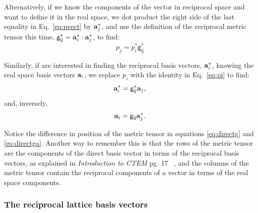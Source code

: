 Alternatively, if we know the components of the vector in reciprocal space and want to define it in the real space, we dot product the right side of the last equality in Eq.~\ref{eq:pvect} by $\vb{a}^*_j$, and use the definition of the reciprocal metric tensor this time, $\mathsf{g^*_{ij}}=\vb{a}^*_i\cdot\vb{a}^*_j$, to find:
\begin{equation}
\label{eq:pi}
p_j=p_i^* \mathsf{g^*_{ij}}
\end{equation}

Similarly, if are interested in finding the reciprocal basis vectors, $\vb{a}^*_i$, knowing the real space basis vectors $\vb{a}_i$, we replace $p_i$ with the identity in Eq.~\ref{eq:pi} to find:
\begin{equation}
\label{eq:astar}
\vb{a}^*_i=\mathsf{g^*_{ij}} \mathbf{a}_j,
\end{equation}
and, inversely, 
\begin{equation}
\label{eq:directga}
\vb{a}_i=\mathsf{g_{ij}} \mathbf{a}^*_j.
\end{equation}

Notice the difference in position of the metric tensor in equations \ref{eq:directg} and \ref{eq:directga}. Another way to remember this is that the rows of the metric tensor are the components of the direct basis vector in terms of the reciprocal basis vectors, as explained in \textit{Introduction to CTEM} pg. 17 ~\cite{MarcTEM03}, and the columns of the metric tensor contain the reciprocal components of a vector in terms of the real space components. 


\subsubsection{The reciprocal lattice basis vectors}
\label{sec:crossProd}

